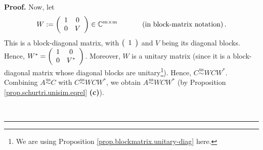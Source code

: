 \documentclass[numbers=enddot,12pt,final,onecolumn,notitlepage]{scrartcl}%
\numberwithin{exer}{subsection}
\theoremstyle{definition}
\newenvironment{proof}[1][Proof]{\noindent\textbf{#1.} }{\ \rule{0.5em}{0.5em}}
\begin{document}
\begin{proof}
Now, let%
\[
W:=\left(
\begin{array}
[c]{cc}%
1 & 0\\
0 & V
\end{array}
\right)  \in\mathbb{C}^{m\times m}\ \ \ \ \ \ \ \ \ \ \left(  \text{in
block-matrix notation}\right)  .
\]
This is a block-diagonal matrix, with $\left(
\begin{array}
[c]{c}%
1
\end{array}
\right)  $ and $V$ being its diagonal blocks. Hence, $W^{\ast}=\left(
\begin{array}
[c]{cc}%
1 & 0\\
0 & V^{\ast}%
\end{array}
\right)  $. Moreover, $W$ is a unitary matrix (since it is a block-diagonal
matrix whose diagonal blocks are unitary\footnote{We are using Proposition
\ref{prop.blockmatrix.unitary-diag} here.}). Hence,
$C\overset{\operatorname*{us}}{\sim}WCW^{\ast}$. Combining
$A\overset{\operatorname*{us}}{\sim}C$ with $C\overset{\operatorname*{us}%
}{\sim}WCW^{\ast}$, we obtain $A\overset{\operatorname*{us}}{\sim}WCW^{\ast}$
(by Proposition \ref{prop.schurtri.unisim.eqrel} \textbf{(c)}).


\end{proof}
\end{document}
